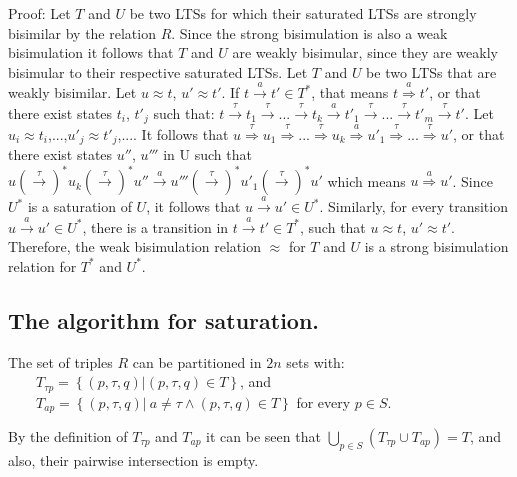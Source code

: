 Proof: Let $T$ and $U$ be two LTSs for which their saturated LTSs are strongly bisimilar by the relation $R$. Since the strong bisimulation is also a weak bisimulation it follows that $T$ and $U$ are weakly bisimular, since they are weakly bisimular to their respective saturated LTSs.
Let $T$ and $U$ be two LTSs that are weakly bisimilar. Let $u\approx t$, $u'\approx t'$. If $t\stackrel{a}{\rightarrow}t'\in T^{*}$, that means $t\stackrel{a}{\Rightarrow}t'$, or that there exist states $t_{i}$, $t'_{j}$ such that: $t\stackrel{\tau}{\rightarrow}t_{1}\stackrel{\tau}{\rightarrow}...\stackrel{\tau}{\rightarrow}t_{k}\stackrel{a}{\rightarrow}t'_{1}\stackrel{\tau}{\rightarrow}...\stackrel{\tau}{\rightarrow}t'_{m}\stackrel{\tau}{\rightarrow}t'$. Let $u_{i}\approx t_{i}$,...,$u'_{j}\approx t'_{j}$,.... It follows that $u\stackrel{\tau}{\Rightarrow}u_{1}\stackrel{\tau}{\Rightarrow}...\stackrel{\tau}{\Rightarrow}u_{k}\stackrel{a}{\Rightarrow}u'_{1}\stackrel{\tau}{\Rightarrow}...\stackrel{\tau}{\Rightarrow}u'$, or that there exist states $u''$, $u'''$ in U such that $u\left(\stackrel{\tau}{\rightarrow}\right)^{*}u_{k}\left(\stackrel{\tau}{\rightarrow}\right)^{*}u''\stackrel{a}{\rightarrow}u'''\left(\stackrel{\tau}{\rightarrow}\right)^{*}u'_{1}\left(\stackrel{\tau}{\rightarrow}\right)^{*}u'$ which means $u\stackrel{a}{\Rightarrow}u'$. Since $U^{*}$ is a saturation of $U$, it follows that $u\stackrel{a}{\rightarrow}u'\in U^{*}$.
Similarly, for every transition $u\stackrel{a}{\rightarrow}u'\in U^{*}$, there is a transition in $t\stackrel{a}{\rightarrow}t'\in T^{*}$, such that $u\approx t$, $u'\approx t'$.
Therefore, the weak bisimulation relation $\approx$ for $T$ and $U$ is a strong bisimulation relation for $T^{*}$ and $U^{*}$.

\subsection{The algorithm for saturation.}

The set of triples ${R}$ can be partitioned in ${2n}$ sets with: \\
\ \ \ \ ${T_{\tau p}=\left\{\left(p,\tau,q\right)| \left(p,\tau,q\right)\in T\right\}}$, and\\
\ \ \ \ ${T_{ap}=\left\{\left(p,\tau,q\right)|\ a\neq\tau\wedge\left(p,\tau,q\right)\in T\right\}}$ for every ${p\in S}$.

By the definition of ${T_{\tau p}}$ and ${T_{ap}}$ it can be seen that ${\bigcup_{p\in S}\left(T_{\tau p}\cup T_{ap}\right)=T}$, and also, their pairwise intersection is empty. 

